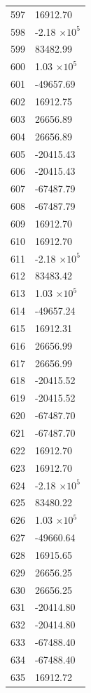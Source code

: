 \documentclass[a4paper,11pt]{article}
\begin{document}
\begin{center}
\begin{longtable}{|R{1.5cm}|R{2.5cm}|}
  597 &     16912.70 \\
  598 &        -2.18 $\times 10^{           5}$ \\
  599 &     83482.99 \\
  600 &         1.03 $\times 10^{           5}$ \\
  601 &    -49657.69 \\
  602 &     16912.75 \\
  603 &     26656.89 \\
  604 &     26656.89 \\
  605 &    -20415.43 \\
  606 &    -20415.43 \\
  607 &    -67487.79 \\
  608 &    -67487.79 \\
  609 &     16912.70 \\
  610 &     16912.70 \\
  611 &        -2.18 $\times 10^{           5}$ \\
  612 &     83483.42 \\
  613 &         1.03 $\times 10^{           5}$ \\
  614 &    -49657.24 \\
  615 &     16912.31 \\
  616 &     26656.99 \\
  617 &     26656.99 \\
  618 &    -20415.52 \\
  619 &    -20415.52 \\
  620 &    -67487.70 \\
  621 &    -67487.70 \\
  622 &     16912.70 \\
  623 &     16912.70 \\
  624 &        -2.18 $\times 10^{           5}$ \\
  625 &     83480.22 \\
  626 &         1.03 $\times 10^{           5}$ \\
  627 &    -49660.64 \\
  628 &     16915.65 \\
  629 &     26656.25 \\
  630 &     26656.25 \\
  631 &    -20414.80 \\
  632 &    -20414.80 \\
  633 &    -67488.40 \\
  634 &    -67488.40 \\
  635 &     16912.72 \\

\end{longtable}
\end{center}
\end{document}
